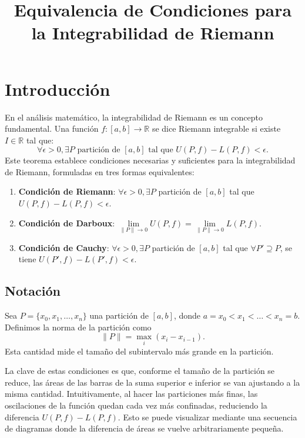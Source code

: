 \documentclass{article}
\title{Equivalencia de Condiciones para la Integrabilidad de Riemann}
\author{}
\date{}
\begin{document}
\maketitle

\section*{Introducción}
En el análisis matemático, la integrabilidad de Riemann es un concepto fundamental. Una función $f: [a, b] \to \mathbb{R}$ se dice Riemann integrable si existe $I \in \mathbb{R}$ tal que:
\[
\forall \epsilon > 0, \exists P \text{ partición de } [a, b] \text{ tal que } U(P, f) - L(P, f) < \epsilon.
\]
Este teorema establece condiciones necesarias y suficientes para la integrabilidad de Riemann, formuladas en tres formas equivalentes:

\begin{enumerate}
    \item \textbf{Condición de Riemann}: $\forall \epsilon > 0, \exists P$ partición de $[a, b]$ tal que $U(P, f) - L(P, f) < \epsilon$.
    \item \textbf{Condición de Darboux}: $\lim\limits_{\lVert P \rVert \to 0} U(P, f) = \lim\limits_{\lVert P \rVert \to 0} L(P, f)$.
    \item \textbf{Condición de Cauchy}: $\forall \epsilon > 0, \exists P$ partición de $[a, b]$ tal que $\forall P' \supseteq P$, se tiene $U(P', f) - L(P', f) < \epsilon$.
\end{enumerate}

\subsection*{Notación}
Sea $ P = \{ x_0, x_1, \dots, x_n \} $ una partición de $ [a, b] $, donde $ a = x_0 < x_1 < \dots < x_n = b $. Definimos la norma de la partición como
\[
\lVert P \rVert = \max_{i} (x_i - x_{i-1}).
\]
Esta cantidad mide el tamaño del subintervalo más grande en la partición.
\\
\par

La clave de estas condiciones es que, conforme el tamaño de la partición se reduce, las áreas de las barras de la suma superior e inferior se van ajustando a la misma cantidad. Intuitivamente, al hacer las particiones más finas, las oscilaciones de la función quedan cada vez más confinadas, reduciendo la diferencia $U(P, f) - L(P, f)$. Esto se puede visualizar mediante una secuencia de diagramas donde la diferencia de áreas se vuelve arbitrariamente pequeña.
\end{document}
